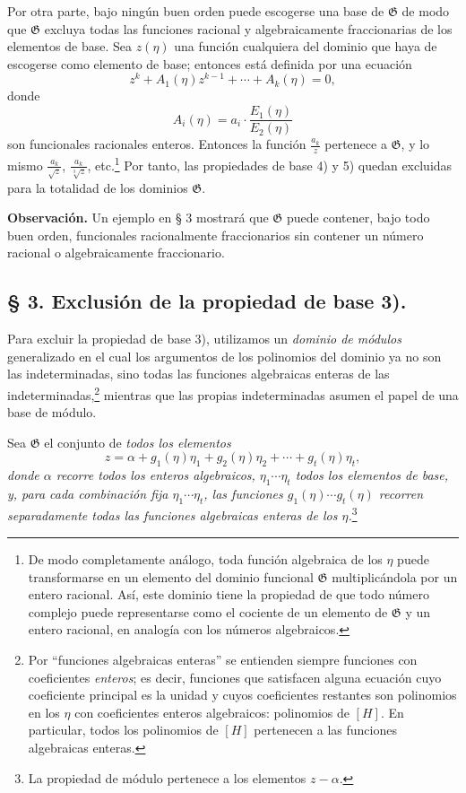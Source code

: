 \documentclass[11pt]{article}
\begin{document}
Por otra parte, bajo ningún buen orden puede escogerse una base de $\mathfrak G$ de modo que $\mathfrak G$ excluya todas las funciones racional y algebraicamente fraccionarias de los elementos de base. Sea $z(\eta)$ una función cualquiera del dominio que haya de escogerse como elemento de base; entonces está definida por una ecuación
\[
 z^k+A_1(\eta)z^{k-1}+\cdots+A_k(\eta)=0,
\]
donde
\[
 A_i(\eta)=a_i\cdot\frac{E_1(\eta)}{E_2(\eta)}
\]
son funcionales racionales enteros. Entonces la función $\frac{a_k}{z}$ pertenece a $\mathfrak G$, y lo mismo $\frac{a_k}{\sqrt z}$, $\frac{a_k}{\sqrt[3]z}$, etc.\footnote{De modo completamente análogo, toda función algebraica de los $\eta$ puede transformarse en un elemento del dominio funcional $\mathfrak G$ multiplicándola por un entero racional. Así, este dominio tiene la propiedad de que todo número complejo puede representarse como el cociente de un elemento de $\mathfrak G$ y un entero racional, en analogía con los números algebraicos.} Por tanto, las propiedades de base 4) y 5) quedan excluidas para la totalidad de los dominios $\mathfrak G$.

\textbf{Observación.} Un ejemplo en § 3 mostrará que $\mathfrak G$ puede contener, bajo todo buen orden, funcionales racionalmente fraccionarios sin contener un número racional o algebraicamente fraccionario.

\subsection*{§ 3. Exclusión de la propiedad de base 3).}

Para excluir la propiedad de base 3), utilizamos un \emph{dominio de módulos} generalizado en el cual los argumentos de los polinomios del dominio ya no son las indeterminadas, sino todas las funciones algebraicas enteras de las indeterminadas,\footnote{Por ``funciones algebraicas enteras'' se entienden siempre funciones con coeficientes \emph{enteros}; es decir, funciones que satisfacen alguna ecuación cuyo coeficiente principal es la unidad y cuyos coeficientes restantes son polinomios en los $\eta$ con coeficientes enteros algebraicos: polinomios de $[H]$. En particular, todos los polinomios de $[H]$ pertenecen a las funciones algebraicas enteras.} mientras que las propias indeterminadas asumen el papel de una base de módulo.

Sea $\mathfrak G$ el conjunto de \emph{todos los elementos}
\begin{equation}
 z=\alpha+g_1(\eta)\eta_1+g_2(\eta)\eta_2+\cdots+g_t(\eta)\eta_t,
\tag{1}
\end{equation}
\emph{donde $\alpha$ recorre todos los enteros algebraicos, $\eta_1\cdots\eta_t$ todos los elementos de base, y, para cada combinación fija $\eta_1\cdots\eta_t$, las funciones $g_1(\eta)\cdots g_t(\eta)$ recorren separadamente todas las funciones algebraicas enteras de los $\eta$.}\footnote{La propiedad de módulo pertenece a los elementos $z-\alpha$.}
\end{document}
